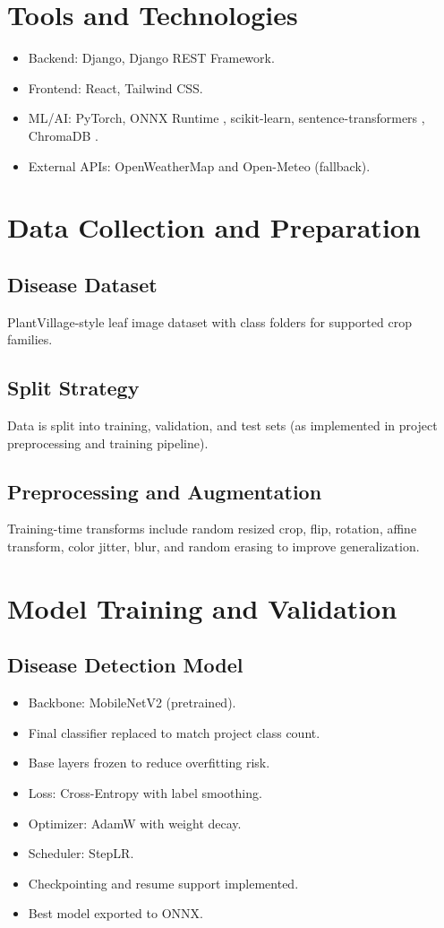 \documentclass[12pt,a4paper]{report}
\begin{document}
\section{Tools and Technologies}
\begin{itemize}[noitemsep]
    \item Backend: Django, Django REST Framework.
    \item Frontend: React, Tailwind CSS.
    \item ML/AI: PyTorch, ONNX Runtime \cite{onnx}, scikit-learn, sentence-transformers \cite{sentence_transformers}, ChromaDB \cite{chromadb}.
    \item External APIs: OpenWeatherMap \cite{openweather} and Open-Meteo \cite{openmeteo} (fallback).
\end{itemize}

\section{Data Collection and Preparation}
\subsection{Disease Dataset}
PlantVillage-style leaf image dataset with class folders for supported crop families.

\subsection{Split Strategy}
Data is split into training, validation, and test sets (as implemented in project preprocessing and training pipeline).

\subsection{Preprocessing and Augmentation}
Training-time transforms include random resized crop, flip, rotation, affine transform, color jitter, blur, and random erasing to improve generalization.

\section{Model Training and Validation}
\subsection{Disease Detection Model}
\begin{itemize}[noitemsep]
    \item Backbone: MobileNetV2 (pretrained).
    \item Final classifier replaced to match project class count.
    \item Base layers frozen to reduce overfitting risk.
    \item Loss: Cross-Entropy with label smoothing.
    \item Optimizer: AdamW with weight decay.
    \item Scheduler: StepLR.
    \item Checkpointing and resume support implemented.
    \item Best model exported to ONNX.
\end{itemize}
\end{document}
